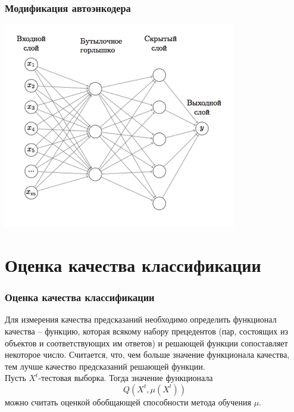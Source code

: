 \documentclass{beamer}
\begin{document}
\begin{frame}
\frametitle{Модификация автоэнкодера}
\begin{center}
	\includegraphics[width=\linewidth,height=.7\textheight,keepaspectratio]{modified_encoder.png}
\end{center}
\end{frame}


\section{Оценка качества классификации}
\begin{frame}
\frametitle{Оценка качества классификации}
Для измерения качества предсказаний необходимо определить функционал
качества – функцию, которая всякому набору прецедентов (пар, состоящих из
объектов и соответствующих им ответов) и решающей функции сопоставляет
некоторое число. Считается, что, чем больше значение функционала качества, тем лучше качество предсказаний решающей функции.
\newline
\newline
\\
Пусть $X^t$-тестовая выборка. Тогда значение функционала $$Q(X^t,\mu(X^l))$$ можно считать оценкой обобщающей способности метода обучения $\mu$.
\end{frame}
\end{document}
